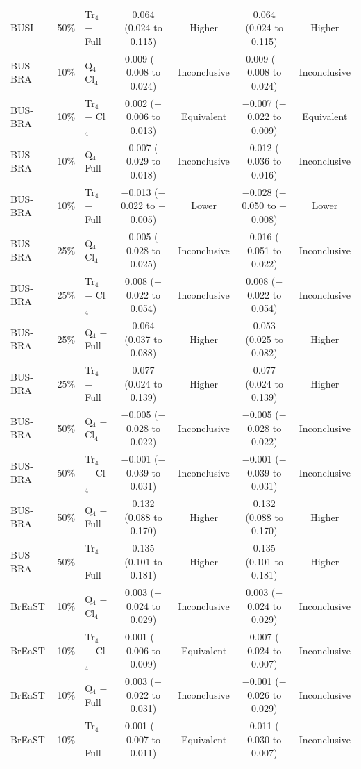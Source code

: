 \begin{longtable}{@{}lrlcccc@{}}
BUSI & 50\% & Tr$_4$ $-$ Full & 0.064 (0.024 to 0.115) & Higher & 0.064 (0.024 to 0.115) & Higher \\
BUS-BRA & 10\% & Q$_4$ $-$ Cl$_4$ & 0.009 ($-$0.008 to 0.024) & Inconclusive & 0.009 ($-$0.008 to 0.024) & Inconclusive \\
BUS-BRA & 10\% & Tr$_4$ $-$ Cl$_4$ & 0.002 ($-$0.006 to 0.013) & Equivalent & $-$0.007 ($-$0.022 to 0.009) & Equivalent \\
BUS-BRA & 10\% & Q$_4$ $-$ Full & $-$0.007 ($-$0.029 to 0.018) & Inconclusive & $-$0.012 ($-$0.036 to 0.016) & Inconclusive \\
BUS-BRA & 10\% & Tr$_4$ $-$ Full & $-$0.013 ($-$0.022 to $-$0.005) & Lower & $-$0.028 ($-$0.050 to $-$0.008) & Lower \\
BUS-BRA & 25\% & Q$_4$ $-$ Cl$_4$ & $-$0.005 ($-$0.028 to 0.025) & Inconclusive & $-$0.016 ($-$0.051 to 0.022) & Inconclusive \\
BUS-BRA & 25\% & Tr$_4$ $-$ Cl$_4$ & 0.008 ($-$0.022 to 0.054) & Inconclusive & 0.008 ($-$0.022 to 0.054) & Inconclusive \\
BUS-BRA & 25\% & Q$_4$ $-$ Full & 0.064 (0.037 to 0.088) & Higher & 0.053 (0.025 to 0.082) & Higher \\
BUS-BRA & 25\% & Tr$_4$ $-$ Full & 0.077 (0.024 to 0.139) & Higher & 0.077 (0.024 to 0.139) & Higher \\
BUS-BRA & 50\% & Q$_4$ $-$ Cl$_4$ & $-$0.005 ($-$0.028 to 0.022) & Inconclusive & $-$0.005 ($-$0.028 to 0.022) & Inconclusive \\
BUS-BRA & 50\% & Tr$_4$ $-$ Cl$_4$ & $-$0.001 ($-$0.039 to 0.031) & Inconclusive & $-$0.001 ($-$0.039 to 0.031) & Inconclusive \\
BUS-BRA & 50\% & Q$_4$ $-$ Full & 0.132 (0.088 to 0.170) & Higher & 0.132 (0.088 to 0.170) & Higher \\
BUS-BRA & 50\% & Tr$_4$ $-$ Full & 0.135 (0.101 to 0.181) & Higher & 0.135 (0.101 to 0.181) & Higher \\
BrEaST & 10\% & Q$_4$ $-$ Cl$_4$ & 0.003 ($-$0.024 to 0.029) & Inconclusive & 0.003 ($-$0.024 to 0.029) & Inconclusive \\
BrEaST & 10\% & Tr$_4$ $-$ Cl$_4$ & 0.001 ($-$0.006 to 0.009) & Equivalent & $-$0.007 ($-$0.024 to 0.007) & Inconclusive \\
BrEaST & 10\% & Q$_4$ $-$ Full & 0.003 ($-$0.022 to 0.031) & Inconclusive & $-$0.001 ($-$0.026 to 0.029) & Inconclusive \\
BrEaST & 10\% & Tr$_4$ $-$ Full & 0.001 ($-$0.007 to 0.011) & Equivalent & $-$0.011 ($-$0.030 to 0.007) & Inconclusive \\

\end{longtable}
